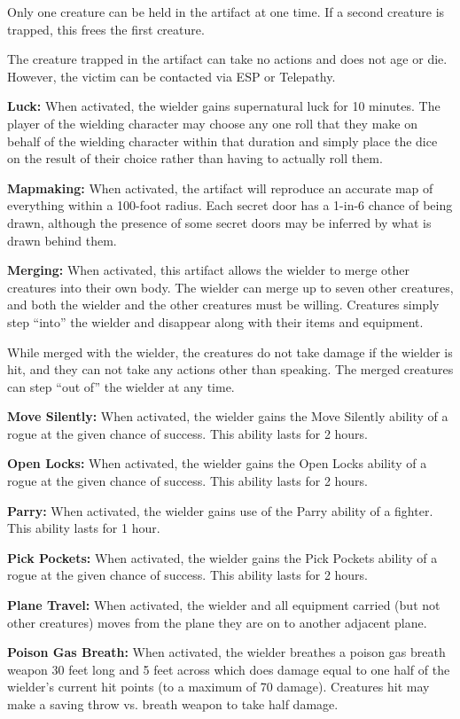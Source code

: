 \begin{multicols*}{2}
Only one creature can be held in the artifact at one time. If a second creature is trapped, this frees the first creature.

The creature trapped in the artifact can take no actions and does not age or die. However, the victim can be contacted via ESP or Telepathy.

\textbf{Luck:} When activated, the wielder gains supernatural luck for 10 minutes. The player of the wielding character may choose any one roll that they make on behalf of the wielding character within that duration and simply place the dice on the result of their choice rather than having to actually roll them.

\textbf{Mapmaking:} When activated, the artifact will reproduce an accurate map of everything within a 100-foot radius. Each secret door has a 1-in-6 chance of being drawn, although the presence of some secret doors may be inferred by what is drawn behind them.

\textbf{Merging:} When activated, this artifact allows the wielder to merge other creatures into their own body. The wielder can merge up to seven other creatures, and both the wielder and the other creatures must be willing. Creatures simply step “into” the wielder and disappear along with their items and equipment.

While merged with the wielder, the creatures do not take damage if the wielder is hit, and they can not take any actions other than speaking. The merged creatures can step “out of” the wielder at any time.

\textbf{Move Silently:} When activated, the wielder gains the Move Silently ability of a rogue at the given chance of success. This ability lasts for 2 hours.

\textbf{Open Locks:} When activated, the wielder gains the Open Locks ability of a rogue at the given chance of success. This ability lasts for 2 hours.

\textbf{Parry:} When activated, the wielder gains use of the Parry ability of a fighter. This ability lasts for 1 hour.

\textbf{Pick Pockets:} When activated, the wielder gains the Pick Pockets ability of a rogue at the given chance of success. This ability lasts for 2 hours.

\textbf{Plane Travel:} When activated, the wielder and all equipment carried (but not other creatures) moves from the plane they are on to another adjacent plane.

\textbf{Poison Gas Breath:} When activated, the wielder breathes a poison gas breath weapon 30 feet long and 5 feet across which does damage equal to one half of the wielder’s current hit points (to a maximum of 70 damage). Creatures hit may make a saving throw vs. breath weapon to take half damage.


\end{multicols*}
